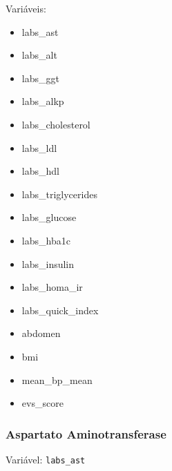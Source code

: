 \documentclass[
  12pt,
]{article}
\providecommand{\tightlist}{%
  \setlength{\itemsep}{0pt}\setlength{\parskip}{0pt}}\usepackage{longtable,booktabs,array}
\begin{document}
Variáveis:

\begin{itemize}
\tightlist
\item
  labs\_ast
\item
  labs\_alt
\item
  labs\_ggt
\item
  labs\_alkp
\item
  labs\_cholesterol
\item
  labs\_ldl
\item
  labs\_hdl
\item
  labs\_triglycerides
\item
  labs\_glucose
\item
  labs\_hba1c
\item
  labs\_insulin
\item
  labs\_homa\_ir
\item
  labs\_quick\_index
\item
  abdomen
\item
  bmi
\item
  mean\_bp\_mean
\item
  evs\_score
\end{itemize}

\subsubsection{Aspartato
Aminotransferase}\label{aspartato-aminotransferase}

Variável: \texttt{labs\_ast}
\end{document}
